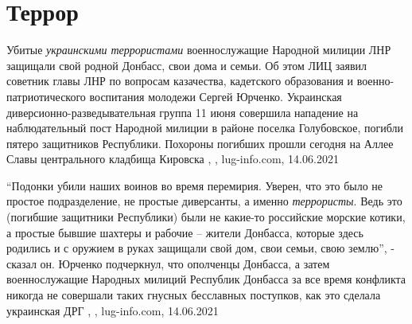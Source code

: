  
 
 
 
 
\chapter{Террор}

Убитые \emph{украинскими террористами} военнослужащие Народной милиции ЛНР защищали
свой родной Донбасс, свои дома и семьи. Об этом ЛИЦ заявил советник главы ЛНР
по вопросам казачества, кадетского образования и военно-патриотического
воспитания молодежи Сергей Юрченко. Украинская диверсионно-разведывательная
группа 11 июня совершила нападение на наблюдательный пост Народной милиции в
районе поселка Голубовское, погибли пятеро защитников Республики. Похороны
погибших прошли сегодня на Аллее Славы центрального кладбища Кировска
, , lug-info.com, 14.06.2021

\enquote{Подонки убили наших воинов во время перемирия. Уверен, что это было не
простое подразделение, не простые диверсанты, а именно \emph{террористы}. Ведь
это (погибшие защитники Республики) были не какие-то российские морские котики,
а простые бывшие шахтеры и рабочие – жители Донбасса, которые здесь родились и
с оружием в руках защищали свой дом, свои семьи, свою землю}, - сказал он.
Юрченко подчеркнул, что ополченцы Донбасса, а затем военнослужащие Народных
милиций Республик Донбасса за все время конфликта никогда не совершали таких
гнусных бесславных поступков, как это сделала украинская ДРГ
, , lug-info.com, 14.06.2021

